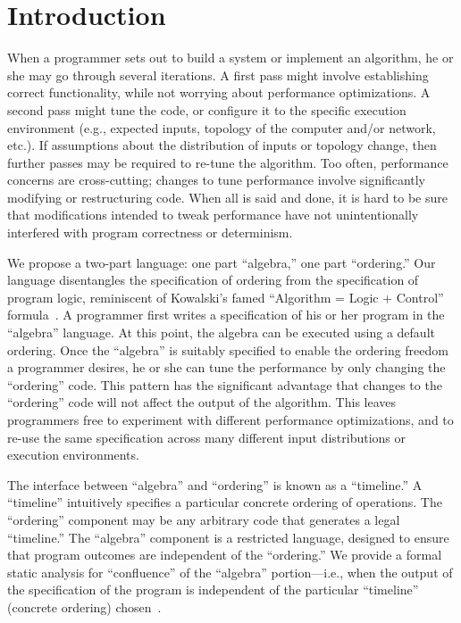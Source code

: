 \section{Introduction}
\label{sec:intro}

When a programmer sets out to build a system or implement an algorithm, he or she may go through
several iterations.  A first pass might involve establishing correct functionality, while not
worrying about performance optimizations.  A second pass might tune the code, or configure it to
the specific execution environment (e.g., expected inputs, topology of the computer and/or network, etc.).  If assumptions about the distribution of inputs or topology change, then further passes may
be required to re-tune the algorithm.  Too often, performance concerns are cross-cutting; changes to
tune performance involve significantly modifying or restructuring code.  When all is said and done,
it is hard to be sure that modifications intended to tweak performance have not unintentionally
interfered with program correctness or determinism.

We propose a two-part language: one part ``algebra,'' one part ``ordering.''  Our language disentangles the specification of ordering from the specification of program logic, reminiscent of Kowalski's famed ``Algorithm = Logic + Control'' formula~\cite{alc}.  A programmer first
writes a specification of his or her program in the ``algebra'' language.  At this point, the algebra
can be executed using a default ordering.
Once the ``algebra'' is suitably specified to enable the ordering freedom a programmer desires, he or she can
tune the performance by only changing the ``ordering'' code.  This pattern has the significant
advantage that changes to the ``ordering'' code will not affect the output of the algorithm.  This
leaves programmers free to experiment with different performance optimizations, and to re-use the
same specification across many different input distributions or execution environments.


The interface between ``algebra'' and ``ordering'' is known as a ``timeline.''  A ``timeline'' intuitively specifies a particular concrete ordering of operations.  The ``ordering'' component may be any arbitrary code that generates a legal ``timeline.''  The ``algebra'' component is a restricted language, designed to ensure that program outcomes are independent of the ``ordering.''  We provide a formal static analysis for ``confluence'' of the ``algebra'' portion---i.e., when the output of the specification of the program is independent of the particular ``timeline'' (concrete ordering) chosen~\cite{this-tr}.


